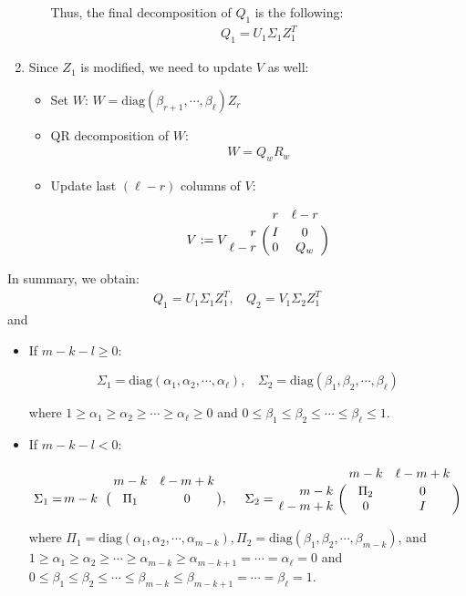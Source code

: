 \begin{enumerate}
\begin{itemize}
Thus, the final decomposition of $Q_1$ is the following:
\begin{align}
Q_1 = U_{1}\Sigma_{1}Z_{1}^{T}
\end{align}
\end{itemize}

\item Since $Z_{1}$ is modified, we need to update $V$ as well:
\begin{itemize}
\item Set $W$: $W = \mbox{diag}(\beta_{r+1}, \cdots, \beta_{\ell})Z_{r}$

\item QR decomposition of $W$:
\begin{align}
W = Q_{w}R_{w}
\end{align}

\item Update last $(\ell-r)$ columns of $V$:
                            
\begin{displaymath}
V := V\bordermatrix{ & r & \ell-r \cr
\hfill r & I & 0 \cr
\hfill \ell-r & 0 & Q_{w}}
\end{displaymath}
\end{itemize}
\end{enumerate}
In summary, we obtain:
\begin{align}
Q_1 = U_{1}\Sigma_{1}Z_{1}^{T}, \ \ \ \ Q_2 = V_{1}\Sigma_{2}Z_{1}^{T}
\end{align}
and
\begin{itemize}
	\item If $m - k - l \geq 0$:
	
	\[
	\Sigma_{1} = \mbox{diag}(\alpha_{1}, \alpha_{2}, \cdots, \alpha_{\ell}), \  \ \ \
    \Sigma_{2} = \mbox{diag}(\beta_{1}, \beta_{2}, \cdots, \beta_{\ell})\]

	where $1 \geq \alpha_{1} \geq \alpha_{2} \geq \cdots \geq \alpha_{\ell} \geq 0$ and $0 \leq \beta_{1} \leq \beta_{2} \leq \cdots \leq \beta_{\ell} \leq 1$.
	
	\item If $m - k - l < 0$:
	
	\[
	\Sigma_{1} = \bordermatrix{ & m-k & \ell-m+k \cr
    	\hfill m-k & \Pi_{1} & 0 }, \  \ \ \
    \Sigma_{2} = \bordermatrix{ & m-k & \ell-m+k   \cr
    	\hfill m-k & \Pi_{2} & 0\cr
        \hfill \ell-m+k & 0 & I}
\]

where $\Pi_{1} = \mbox{diag}(\alpha_{1}, \alpha_{2}, \cdots, \alpha_{m-k}), \Pi_{2} = \mbox{diag}(\beta_{1}, \beta_{2}, \cdots, \beta_{m-k})$, and $1 \geq \alpha_{1} \geq \alpha_{2} \geq \cdots \geq \alpha_{m-k} \geq \alpha_{m-k+1} = \cdots = \alpha_{\ell} = 0$ and $0 \leq \beta_{1} \leq \beta_{2} \leq \cdots \leq \beta_{m-k} \leq \beta_{m-k+1} = \cdots = \beta_{\ell} = 1$.
	
\end{itemize}
        
